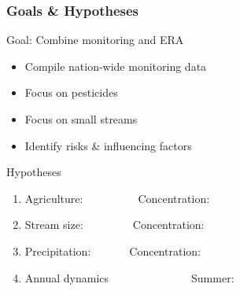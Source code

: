 \documentclass[
	12pt
	]{beamer}
\begin{document}
\begin{frame}
\frametitle{Goals \& Hypotheses}
	\begin{exampleblock}{Goal: Combine monitoring and ERA}
		\begin{itemize}
			\item Compile nation-wide monitoring data %
			\item Focus on pesticides
			\item Focus on small streams
			\item Identify risks \& influencing factors
		\end{itemize}
	\end{exampleblock}
	\pause
	\begin{exampleblock}{Hypotheses}
		\begin{enumerate}
			\item Agriculture:~~~~~\textbf{\Large\textuparrow}~~~~~Concentration: \textbf{\Large\textuparrow}
			\pause
			\item Stream size:~~~~\textbf{\Large\textdownarrow}~~~~~Concentration: \textbf{\Large\textuparrow}
			\pause
			\item Precipitation:~~\textbf{\Large\textuparrow}~~~~~Concentration: \textbf{\Large\textuparrow}
			\pause
			\item Annual dynamics~~~~~~~~~~~~~~~Summer: \textbf{\Large\textuparrow}
		\end{enumerate}
	\end{exampleblock}
\end{frame}
\end{document}
